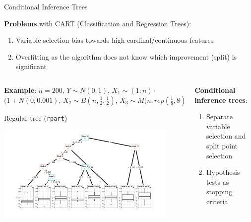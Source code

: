 \documentclass[11pt,compress,t,notes=noshow, aspectratio=169, xcolor=table]{beamer}
\begin{document}
\begin{frame}{Conditional Inference Trees}  
\vspace{-0.2cm}

\vspace{0.3cm}
\textbf{Problems} with CART (Classification and Regression Trees): 

\begin{enumerate}
    \item Variable selection bias towards high-cardinal/continuous features 
    \item Overfitting as the algorithm does not know which improvement (split) is significant 
\end{enumerate}
\medskip
\scriptsize
\pause
\begin{columns}[T, totalwidth = \linewidth]
    \begin{column}{0.6\textwidth}
        \textbf{Example}: $n = 200,\, Y \sim N(0,1),\, X_1 \sim (1:n)\cdot$ $ (1+N(0, 0.001),\, X_2 \sim B(n, \frac{1}{2},\frac{1}{2}),\, X_3 \sim M(n, rep(\frac{1}{8},8)$
    
    \medskip
    \scriptsize{Regular tree (\texttt{rpart})}\begin{center}
    \vspace{-0.7cm}
    \includegraphics[width = 0.9\textwidth]{figure/selection_bias_simulation_tree.pdf}
    \end{center}
    \end{column}
    \pause
    \begin{column}{0.4\textwidth}
    
        \textbf{Conditional inference trees}: 
        \begin{enumerate}  
        \item Separate variable selection and split point selection  
        \item Hypothesis tests as stopping criteria 
        \end{enumerate}
    

\end{column}
\end{columns}
\end{frame}
\end{document}
